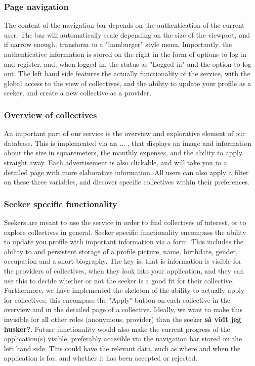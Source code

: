 \subsubsection{Page navigation}

The content of the navigation bar depends on the authentication of the current user. 
The bar will automatically scale depending on the size of the viewport, and if narrow enough, transform to a "hamburger" style menu. 
Importantly, the authenticative information is stored on the right in the form of options to log in and register, and, when logged in, the status as "Logged in" and the option to log out. 
The left hand side features the actually functionality of the service, with the global access to the view of collectives, and the ability to update your profile as a seeker, and create a new collective as a provider. 

\subsubsection{Overview of collectives}

An important part of our service is the overview and explorative element of our database. This is implemented via an ... , that displays an image and information about the size in squaremeters, the monthly expenses, and the ability to apply straight away. 
Each advertisement is also clickable, and will take you to a detailed page with more elaborative information. All users can also apply a filter on these three variables, and discover specific collectives within their preferences. 

\subsubsection{Seeker specific functionality}

Seekers are meant to use the service in order to find collectives of interest, or to explore collectives in general. 
Seeker specific functionality encompass the ability to update you profile with important information via a form. 
This includes the ability to and persistent storage of a profile picture, name, birthdate, gender, occupation and a short biography. The key is, that is information is visible for the providers of collectives, when they look into your application, and they can use this to decide whether or not the seeker is a good fit for their collective. 
Furthermore, we have implemented the skeleton of the ability to actually apply for collectives; this encompass the "Apply" button on each collective in the overview and in the detailed page of a collective.
Ideally, we want to make this invisible for all other roles (anonymous, provider) than the seeker \textbf{så vidt jeg husker?}. Future functionality would also make the current progress of the application(s) visible, preferably accesible via the navigation bar stored on the left hand side. 
This could have the relevant data, such as where and when the application is for, and whether it has been accepted or rejected. 

